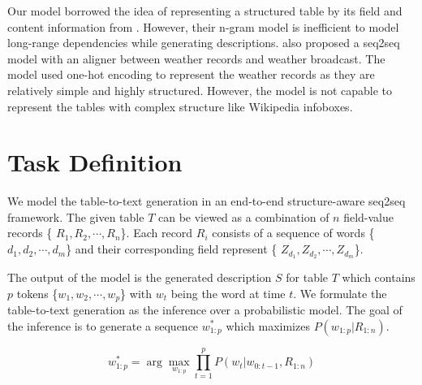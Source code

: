 \documentclass[letterpaper]{article} %
\begin{document}
Our model borrowed the idea of representing a structured table by its field and content information from \cite{lebret2016neural}. However, 
their n-gram model is inefficient to model long-range dependencies while generating descriptions.
\citeauthor{mei2015talk}  also proposed a seq2seq model with an aligner between weather records and weather broadcast. The model used one-hot encoding to represent the weather records as they are relatively simple and highly structured. However, the model is not capable to represent the tables with complex structure like Wikipedia infoboxes.    
\section{Task Definition}


We model the table-to-text generation in an end-to-end structure-aware seq2seq framework. The given table $T$ can be viewed as a combination of $n$ field-value records \{ $R_1, R_2, \cdots, R_n$\}. Each record $R_i$ consists of a sequence of words \{ $d_1, d_2, \cdots, d_m$\} and their corresponding field represent \{ $Z_{d_1}, Z_{d_2}, \cdots, Z_{d_m}$\}.

The output of the model is the generated description $S$ for table $T$ which contains $p$ tokens \{$w_1, w_2, \cdots, w_p $\} with $w_t$ being the word at time $t$. We formulate the table-to-text generation as the inference over a probabilistic model.
The goal of the inference is to generate a sequence $w_{1:p}^*$ which maximizes $P(w_{1:p}|R_{1:n})$.  

\begin{equation}
	w_{1:p}^* = \arg \max \limits_{w_{1:p}} \prod_{t=1}^{p} P(w_t|w_{0:t-1},R_{1:n})
	\label{io1}
\end{equation}
\end{document}
